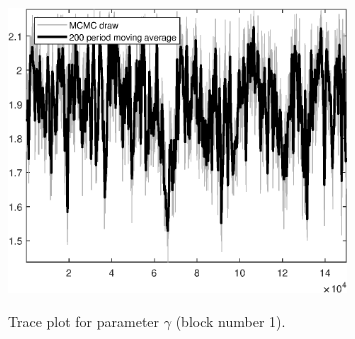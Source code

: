 \begin{figure}[H]
\centering
  \includegraphics[width=0.8\textwidth]{BRS_gen/graphs/TracePlot_gam_blck_1}\\
    \caption{Trace plot for parameter ${\gamma}$ (block number 1).}
\end{figure}
